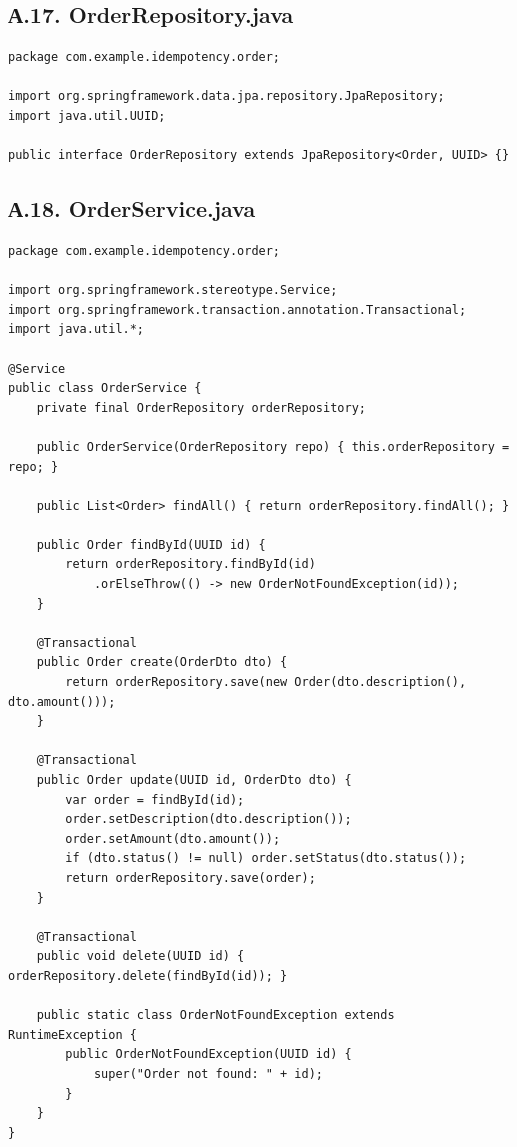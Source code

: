 \subsection*{А.17. OrderRepository.java}
\begin{lstlisting}[caption={OrderRepository.java}]
package com.example.idempotency.order;

import org.springframework.data.jpa.repository.JpaRepository;
import java.util.UUID;

public interface OrderRepository extends JpaRepository<Order, UUID> {}
\end{lstlisting}

\subsection*{А.18. OrderService.java}
\begin{lstlisting}[caption={OrderService.java --- бизнес-логика заказов}]
package com.example.idempotency.order;

import org.springframework.stereotype.Service;
import org.springframework.transaction.annotation.Transactional;
import java.util.*;

@Service
public class OrderService {
    private final OrderRepository orderRepository;

    public OrderService(OrderRepository repo) { this.orderRepository = repo; }

    public List<Order> findAll() { return orderRepository.findAll(); }

    public Order findById(UUID id) {
        return orderRepository.findById(id)
            .orElseThrow(() -> new OrderNotFoundException(id));
    }

    @Transactional
    public Order create(OrderDto dto) {
        return orderRepository.save(new Order(dto.description(), dto.amount()));
    }

    @Transactional
    public Order update(UUID id, OrderDto dto) {
        var order = findById(id);
        order.setDescription(dto.description());
        order.setAmount(dto.amount());
        if (dto.status() != null) order.setStatus(dto.status());
        return orderRepository.save(order);
    }

    @Transactional
    public void delete(UUID id) { orderRepository.delete(findById(id)); }

    public static class OrderNotFoundException extends RuntimeException {
        public OrderNotFoundException(UUID id) {
            super("Order not found: " + id);
        }
    }
}
\end{lstlisting}


